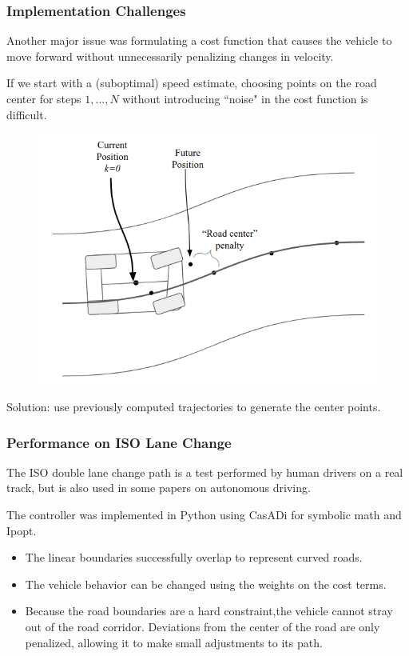 \documentclass{beamer}
\begin{document}
\begin{frame}
\frametitle{Implementation Challenges}
Another major issue was formulating a cost function that causes the vehicle to move forward without  unnecessarily penalizing changes in velocity.

If we start with a (suboptimal) speed estimate, choosing points on the road center for steps $1,\dots,N$ without introducing ``noise" in the cost function is difficult.


\begin{figure}
	\includegraphics[width=0.55\linewidth]{figures/centering_issue.png}
\end{figure}
\vspace{-0.5em}

Solution: use previously computed trajectories to generate the center points.

\end{frame}


\begin{frame}
\frametitle{Performance on ISO Lane Change}
The ISO double lane change path is a test performed by human drivers on a real track, but is also used in some papers on autonomous driving.

The controller was implemented in Python using CasADi for symbolic math and Ipopt.
\begin{itemize}
	\item The linear boundaries successfully overlap to represent curved roads.
	\item The vehicle behavior can be changed using the weights on the cost terms.
	\item Because the road boundaries are a hard constraint,the vehicle cannot stray out of the road corridor. Deviations from the center of the road are only penalized, allowing it to make small adjustments to its path.
\end{itemize}
\end{frame}
\end{document}
